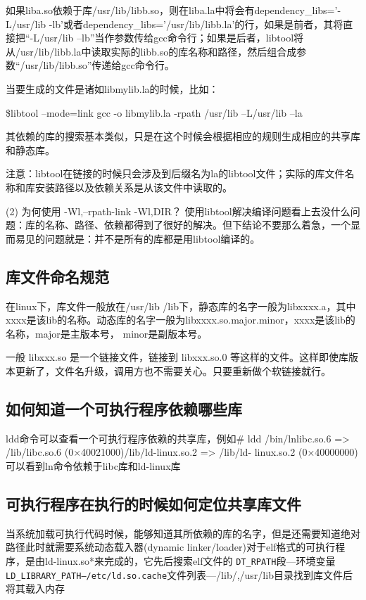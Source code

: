 如果liba.so依赖于库/usr/lib/libb.so，则在liba.la中将会有dependency\_libs=’-L/usr/lib -lb’或者dependency\_libs=’/usr/lib/libb.la’的行，如果是前者，其将直接把“-L/usr/lib –lb”当作参数传给gcc命令行；如果是后者，libtool将从/usr/lib/libb.la中读取实际的libb.so的库名称和路径，然后组合成参数“/usr/lib/libb.so”传递给gcc命令行。 

当要生成的文件是诸如libmylib.la的时候，比如： 

\$libtool --mode=link gcc -o libmylib.la -rpath /usr/lib –L/usr/lib –la 

其依赖的库的搜索基本类似，只是在这个时候会根据相应的规则生成相应的共享库和静态库。 

注意：libtool在链接的时候只会涉及到后缀名为la的libtool文件；实际的库文件名称和库安装路径以及依赖关系是从该文件中读取的。 

(2) 为何使用 -Wl,--rpath-link -Wl,DIR？ 
使用libtool解决编译问题看上去没什么问题：库的名称、路径、依赖都得到了很好的解决。但下结论不要那么着急，一个显而易见的问题就是：并不是所有的库都是用libtool编译的。 


\subsection{库文件命名规范}  
在linux下，库文件一般放在/usr/lib /lib下，静态库的名字一般为libxxxx.a，其中xxxx是该lib的名称。动态库的名字一般为libxxxx.so.major.minor，xxxx是该lib的名称，major是主版本号， minor是副版本号。

 一般 libxxx.so 是一个链接文件，链接到 libxxx.so.0 等这样的文件。这样即使库版本更新了，文件名升级，调用方也不需要关心。只要重新做个软链接就行。


\subsection{如何知道一个可执行程序依赖哪些库}
  ldd命令可以查看一个可执行程序依赖的共享库，例如\# ldd /bin/lnlibc.so.6   => /lib/libc.so.6 (0×40021000)/lib/ld-linux.so.2   => /lib/ld- linux.so.2 (0×40000000)   可以看到ln命令依赖于libc库和ld-linux库  

 
\subsection{可执行程序在执行的时候如何定位共享库文件}
当系统加载可执行代码时候，能够知道其所依赖的库的名字，但是还需要知道绝对路径此时就需要系统动态载入器(dynamic linker/loader)对于elf格式的可执行程序，是由ld-linux.so*来完成的，它先后搜索elf文件的 \verb|DT_RPATH|段—环境变量 \verb|LD_LIBRARY_PATH—/etc/ld.so.cache|文件列表—/lib/,/usr/lib目录找到库文件后将其载入内存    


